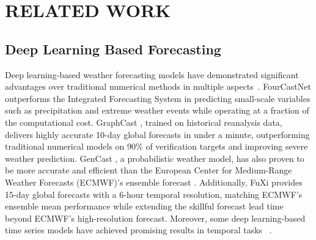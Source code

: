 \section{RELATED WORK}
\subsection{Deep Learning Based Forecasting }
Deep learning-based weather forecasting models have demonstrated significant advantages over traditional numerical methods in multiple aspects~\cite{leinonen2023latent, li2024cllmatemultimodalllmweather, salman2015weather,hewage2021deep}. FourCastNet \cite{pathak2022fourcastnet} outperforms the Integrated Forecasting System in predicting small-scale variables such as precipitation and extreme weather events while operating at a fraction of the computational cost. GraphCast \cite{lam2022graphcast}, trained on historical reanalysis data, delivers highly accurate 10-day global forecasts in under a minute, outperforming traditional numerical models on 90\% of verification targets and improving severe weather prediction. GenCast \cite{price2023gencast}, a probabilistic weather model, has also proven to be more accurate and efficient than the European Center for Medium-Range Weather Forecasts (ECMWF)'s ensemble forecast \cite{molteni1996ecmwf}. Additionally, FuXi \cite{chen2023fuxi} provides 15-day global forecasts with a 6-hour temporal resolution, matching ECMWF’s ensemble mean performance while extending the skillful forecast lead time beyond ECMWF's high-resolution forecast. Moreover, some deep learning-based time series models have achieved promising results in temporal tasks ~\citep{zhou2022fedformer,zhang2023crossformer,eldele2024tslanet,yi2024fouriergnn}.

